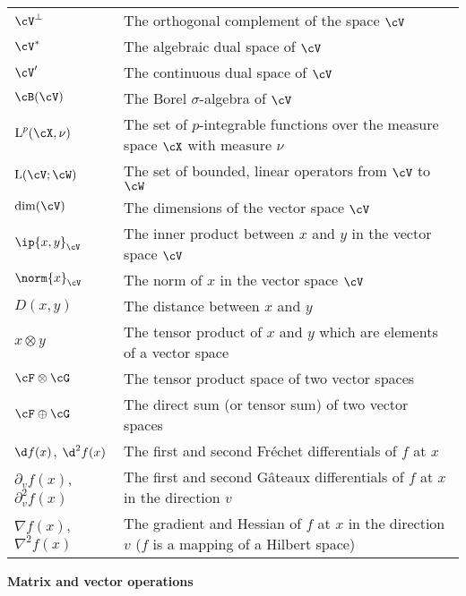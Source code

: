 \begin{longtable}{p{}p{}}
  $\cV^\bot$ & The orthogonal complement of the space $\cV$  \\  
  $\cV^*$ & The algebraic dual space of $\cV$ \\    
  $\cV'$ & The continuous dual space of $\cV$ \\  
  $\cB(\cV)$ & The Borel $\sigma$-algebra of $\cV$ \\    
  $\text{L}^p(\cX,\nu)$ & The set of $p$-integrable functions over the measure space $\cX$ with measure $\nu$ \\   
  $\text{L}(\cV;\cW)$ & The set of bounded, linear operators from $\cV$ to $\cW$ \\      
  $\dim(\cV)$ & The dimensions of the vector space $\cV$ \\         
  $\ip{x,y}_\cV$ & The inner product between $x$ and $y$ in the vector space $\cV$\\   
  $\norm{x}_\cV$ & The norm of $x$ in the vector space $\cV$ \\    
  $D(x,y)$ & The distance between $x$ and $y$ \\  
  $x \otimes y$ & The tensor product of $x$ and $y$ which are elements of a vector space \\
  $\cF \otimes \cG$ & The tensor product space of two vector spaces \\
  $\cF \oplus \cG$ & The direct sum (or tensor sum) of two vector spaces \\
  $\d f(x)$, $\d^2 f(x)$  & The first and second Fréchet differentials of $f$ at $x$ \\
  $\partial_v f(x)$, $\partial_v^2 f(x)$  & The first and second Gâteaux differentials of $f$ at $x$ in the direction $v$ \\  
  $\nabla f(x)$, $\nabla^2 f(x)$  & The gradient and Hessian of $f$ at $x$ in the direction $v$ ($f$ is a mapping of a Hilbert space)  \\    
\end{longtable}

\noindent\textbf{Matrix and vector operations}

